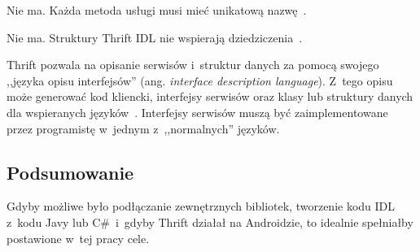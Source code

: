 \begin{description}
Nie ma. Każda metoda usługi musi mieć unikatową nazwę~\cite{thrift-features}.

Nie ma. Struktury Thrift IDL nie wspierają dziedziczenia~\cite{thrift-features}.

Thrift pozwala na opisanie serwisów i~struktur danych za pomocą swojego ,,języka opisu interfejsów'' (ang. \emph{interface description language}).
Z~tego opisu może generować kod kliencki, interfejsy serwisów oraz klasy lub struktury danych dla wspieranych języków~\cite{thrift-features}.
Interfejsy serwisów muszą być zaimplementowane przez programistę w~jednym z~,,normalnych'' języków.

\end{description}

\subsection{Podsumowanie}
Gdyby możliwe było podłączanie zewnętrznych bibliotek, tworzenie kodu IDL z~kodu Javy lub C\#~i~gdyby Thrift działał na Androidzie, to idealnie spełniałby postawione w~tej pracy cele.




